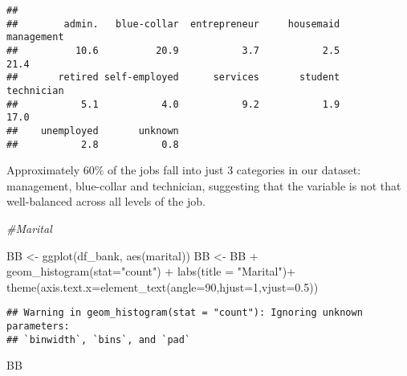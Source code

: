 \documentclass[
]{article}
\newenvironment{Shaded}{\begin{snugshade}}{\end{snugshade}}
\newcommand{\AttributeTok}[1]{\textcolor[rgb]{0.77,0.63,0.00}{#1}}
\newcommand{\CommentTok}[1]{\textcolor[rgb]{0.56,0.35,0.01}{\textit{#1}}}
\newcommand{\DecValTok}[1]{\textcolor[rgb]{0.00,0.00,0.81}{#1}}
\newcommand{\FloatTok}[1]{\textcolor[rgb]{0.00,0.00,0.81}{#1}}
\newcommand{\FunctionTok}[1]{\textcolor[rgb]{0.00,0.00,0.00}{#1}}
\newcommand{\NormalTok}[1]{#1}
\newcommand{\OtherTok}[1]{\textcolor[rgb]{0.56,0.35,0.01}{#1}}
\newcommand{\SpecialCharTok}[1]{\textcolor[rgb]{0.00,0.00,0.00}{#1}}
\newcommand{\StringTok}[1]{\textcolor[rgb]{0.31,0.60,0.02}{#1}}
\begin{document}
\begin{Shaded}
\end{Shaded}

\begin{verbatim}
## 
##        admin.   blue-collar  entrepreneur     housemaid    management 
##          10.6          20.9           3.7           2.5          21.4 
##       retired self-employed      services       student    technician 
##           5.1           4.0           9.2           1.9          17.0 
##    unemployed       unknown 
##           2.8           0.8
\end{verbatim}

Approximately 60\% of the jobs fall into just 3 categories in our
dataset: management, blue-collar and technician, suggesting that the
variable is not that well-balanced across all levels of the job.

\begin{Shaded}
\begin{Highlighting}[]
\CommentTok{\#Marital}

\NormalTok{BB }\OtherTok{\textless{}{-}} \FunctionTok{ggplot}\NormalTok{(df\_bank, }\FunctionTok{aes}\NormalTok{(marital))}
\NormalTok{BB }\OtherTok{\textless{}{-}}\NormalTok{ BB  }\SpecialCharTok{+} \FunctionTok{geom\_histogram}\NormalTok{(}\AttributeTok{stat=}\StringTok{"count"}\NormalTok{) }\SpecialCharTok{+} \FunctionTok{labs}\NormalTok{(}\AttributeTok{title =} \StringTok{"Marital"}\NormalTok{)}\SpecialCharTok{+}
  \FunctionTok{theme}\NormalTok{(}\AttributeTok{axis.text.x=}\FunctionTok{element\_text}\NormalTok{(}\AttributeTok{angle=}\DecValTok{90}\NormalTok{,}\AttributeTok{hjust=}\DecValTok{1}\NormalTok{,}\AttributeTok{vjust=}\FloatTok{0.5}\NormalTok{))}
\end{Highlighting}
\end{Shaded}

\begin{verbatim}
## Warning in geom_histogram(stat = "count"): Ignoring unknown parameters:
## `binwidth`, `bins`, and `pad`
\end{verbatim}

\begin{Shaded}
\begin{Highlighting}[]
\NormalTok{BB}
\end{Highlighting}
\end{Shaded}
\end{document}
